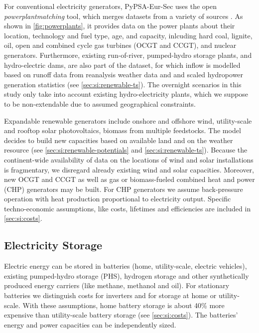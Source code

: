 For conventional electricity generators, PyPSA-Eur-Sec uses the open
\textit{powerplantmatching} tool, which merges datasets from a variety of
sources . As shown in \cref{fig:powerplants},
it provides data on the power plants about their location, technology and fuel
type, age, and capacity, inlcuding hard coal, lignite, oil, open and combined
cycle gas turbines (OCGT and CCGT), and nuclear generators. Furthermore,
existing run-of-river, pumped-hydro storage plants, and hydro-electric dams, are
also part of the dataset, for which inflow is modelled based on runoff data from
reanalysis weather data and and scaled hydropower generation statistics (see
\cref{sec:si:renewable-ts}). The overnight scenarios in this study only take
into account existing hydro-electricity plants, which we suppose to be
non-extendable due to assumed geographical constraints.

Expandable renewable generators include onshore and offshore wind, utility-scale
and rooftop solar photovoltaics, biomass from multiple feedstocks. The model
decides to build new capacities based on available land and on the weather
resource (see \cref{sec:si:renewable-potentials} and
\cref{sec:si:renewable-ts}). Because the continent-wide availability of data on
the locations of wind and solar installations is fragmentary, we disregard
already existing wind and solar capacities. Moreover, new OCGT and CCGT as well
as gas or biomass-fueled combined heat and power (CHP) generators may be built.
For CHP generators we assume back-pressure operation with heat production
proportional to electricity output. Specific techno-economic assumptions, like
costs, lifetimes and efficiencies are included in \cref{sec:si:costs}.

\subsection{Electricity Storage}
\label{sec:si:electricity:storage}

Electric energy can be stored in batteries (home, utility-scale, electric
vehicles), existing pumped-hydro storage (PHS), hydrogen storage and other
synthetically produced energy carriers (like methane, methanol and oil). For
stationary batteries we distinguish costs for inverters and for storage at home
or utility-scale. With these assumptions, home battery storage is about 40\%
more expensive than utility-scale battery storage (see \cref{sec:si:costs}). The
batteries' energy and power capacities can be independently sized.

